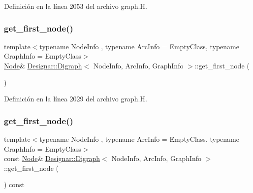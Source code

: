 Definición en la línea 2053 del archivo graph.\+H.

\mbox{\label{class_designar_1_1_digraph_a420caa785d93decc7b096de9e51644e7}} 
\subsubsection{\texorpdfstring{get\+\_\+first\+\_\+node()}{get\_first\_node()}\hspace{0.1cm}{\footnotesize\ttfamily [1/2]}}
{\footnotesize\ttfamily template$<$typename Node\+Info , typename Arc\+Info  = Empty\+Class, typename Graph\+Info  = Empty\+Class$>$ \\
\hyperlink{class_designar_1_1_digraph_a4dc921c41a480b7946a04170e997d8ae}{Node}\& \hyperlink{class_designar_1_1_digraph}{Designar\+::\+Digraph}$<$ Node\+Info, Arc\+Info, Graph\+Info $>$\+::get\+\_\+first\+\_\+node (\begin{DoxyParamCaption}{ }\end{DoxyParamCaption})\hspace{0.3cm}{\ttfamily [inline]}}



Definición en la línea 2029 del archivo graph.\+H.

\mbox{\label{class_designar_1_1_digraph_ada5266ac3e2ed091a37c434dd7484bb9}} 
\subsubsection{\texorpdfstring{get\+\_\+first\+\_\+node()}{get\_first\_node()}\hspace{0.1cm}{\footnotesize\ttfamily [2/2]}}
{\footnotesize\ttfamily template$<$typename Node\+Info , typename Arc\+Info  = Empty\+Class, typename Graph\+Info  = Empty\+Class$>$ \\
const \hyperlink{class_designar_1_1_digraph_a4dc921c41a480b7946a04170e997d8ae}{Node}\& \hyperlink{class_designar_1_1_digraph}{Designar\+::\+Digraph}$<$ Node\+Info, Arc\+Info, Graph\+Info $>$\+::get\+\_\+first\+\_\+node (\begin{DoxyParamCaption}{ }\end{DoxyParamCaption}) const\hspace{0.3cm}{\ttfamily [inline]}}



